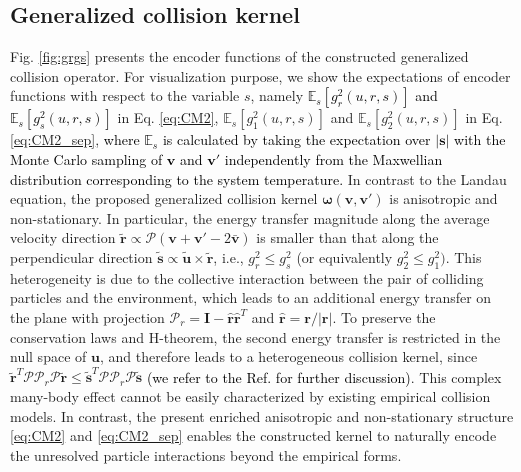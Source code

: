 \documentclass[preprint,1p,times]{elsarticle}
\theoremstyle{definition}
\theoremstyle{remark}
\newcommand{\tcb}[1]{\textcolor{black}{#1}}
\newcommand{\tcr}[1]{\textcolor{black}{#1}}
\begin{document}
\subsection{Generalized collision kernel}
Fig. \ref{fig:grgs} presents the encoder functions of the constructed generalized collision operator. For visualization purpose, we show the expectations of encoder functions with respect to the variable $s$, namely \tcb{$\mathbb{E}_{s}[g_{r}^2(u, r, s)]$ and $\mathbb{E}_{s}[g_{s}^2(u, r, s)]$} in Eq. \eqref{eq:CM2}, $\mathbb{E}_{s}[g_{1}^2(u, r, s)]$ and $\mathbb{E}_{s}[g_{2}^2(u, r, s)]$ in Eq. \eqref{eq:CM2_sep}, 
\tcb{where $\mathbb{E}_{s}$ is calculated by taking the expectation over $|\bm{s}|$ with the Monte Carlo sampling of $\boldsymbol{v}$ and $\boldsymbol{v}'$ independently from the Maxwellian distribution corresponding to the system temperature.}
In contrast to the Landau equation, the proposed generalized collision kernel $\boldsymbol{\omega} (\boldsymbol{v}, \boldsymbol{v}')$ is anisotropic and non-stationary. In particular, the energy transfer magnitude along the average velocity direction $\widetilde{\boldsymbol{r}} \propto \mathcal{P}(\boldsymbol{v} + \boldsymbol{v}' - 2\bar{\boldsymbol{v}})$  is smaller than that along the perpendicular direction $\widetilde{\boldsymbol{s}} \propto \widetilde{\boldsymbol{u}}\times \widetilde{\boldsymbol{r}}$, i.e., $g_{r}^{2} \leq g_{s}^{2}$ (or equivalently $g_2^2 \leq g_1^2)$. This heterogeneity is due to the collective interaction between the pair of colliding particles and the environment, which leads to an additional energy transfer on the plane with projection $\mathcal{P}_r = \boldsymbol{I} - \hat{\boldsymbol{r}}\hat{\boldsymbol{r}}^T$ and $\hat{\boldsymbol{r}} = \boldsymbol{r}/\vert \boldsymbol{r}\vert$. To preserve the conservation laws and H-theorem, the second energy transfer is restricted in the null space of $\boldsymbol{u}$, and therefore leads to a heterogeneous collision kernel, since $\widetilde{\boldsymbol{r}}^T \mathcal{P} \mathcal{P}_r \mathcal{P} \widetilde{\boldsymbol{r}} \le \widetilde{\boldsymbol{s}}^T \mathcal{P} \mathcal{P}_r \mathcal{P} \widetilde{\boldsymbol{s}}$ \tcr{(we refer to the Ref. \cite{zhao2025data} for further discussion)}. This complex many-body effect cannot be easily characterized by existing empirical collision models. In contrast, the present
enriched anisotropic and non-stationary structure \eqref{eq:CM2} and \eqref{eq:CM2_sep} enables the constructed kernel to naturally encode the unresolved particle interactions beyond the empirical forms. 
\end{document}

